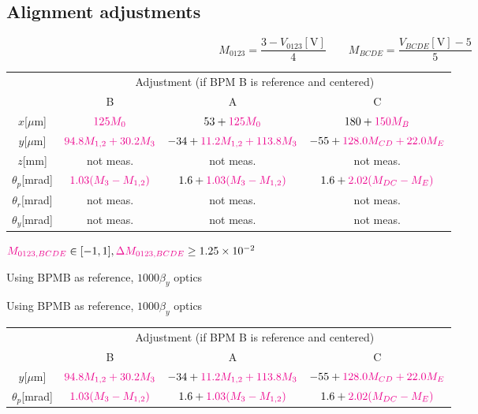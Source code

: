 \subsection{Alignment adjustments}
\begin{equation}
 M_{0123}=\frac{3-V_{0123}[\text{V}]}{4} \qquad M_{BCDE}=\frac{V_{BCDE}[\text{V}]-5}{5}
\end{equation}
{\scriptsize
\begin{tabular}{|c||c|c|c|}\hline
 &\multicolumn{3}{|c|}{Adjustment (if BPM B is reference and centered)}\\\cline{2-4}
 & B & A & C\\\hline\hline
$x$[$\mu$m] & ${\color{magenta}125M_0}$ & $53+{\color{magenta}125M_0}$&${180+\color{magenta}150M_{B}}$\\
$y$[$\mu$m]& ${\color{magenta}94.8M_{1,2}+30.2M_3}$ & $-34+{\color{magenta}11.2M_{1,2}+113.8M_3}$&$-55+{\color{magenta}128.0M_{CD}+22.0M_E}$\\
$z$[mm]& not meas. & not meas.& not meas.\\
$\theta_{p}$[mrad]& ${\color{magenta}1.03(M_3-M_{1,2})}$ & $1.6+{\color{magenta}1.03(M_3-M_{1,2})}$ &$1.6+{\color{magenta} 2.02(M_{DC}-M_E)}$\\
$\theta_{r}$[mrad]& not meas.&not meas.&not meas.\\
$\theta_{y}$[mrad]& not meas.&not meas.&not meas.\\\hline
\end{tabular}}\par
${\color{magenta} M_{0123,BCDE}}\in[-1,1],{\color{magenta}\Delta M_{0123,BCDE}}\geq1.25\times 10^{-2}$\par
{\tiny Using BPMB as reference,  $1000\beta_y$ optics}\par
{\tiny Using BPMB as reference,  $1000\beta_y$ optics}\par
\centering
{\scriptsize
\begin{tabular}{|c||c|c|c|}\hline
 &\multicolumn{3}{|c|}{Adjustment (if BPM B is reference and centered)}\\\cline{2-4}
 & B & A & C\\\hline\hline
$y$[$\mu$m]& ${\color{magenta}94.8M_{1,2}+30.2M_3}$ & $-34+{\color{magenta}11.2M_{1,2}+113.8M_3}$&$-55+{\color{magenta}128.0M_{CD}+22.0M_E}$\\
$\theta_{p}$[mrad]& ${\color{magenta}1.03(M_3-M_{1,2})}$ & $1.6+{\color{magenta}1.03(M_3-M_{1,2})}$ &$1.6+{\color{magenta} 2.02(M_{DC}-M_E)}$\\\hline
\end{tabular}}\par

